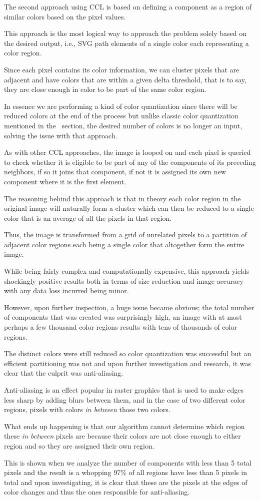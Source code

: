 \documentclass[12pt]{article}
\newcommand{\sentence}{} %
\newcommand{\italic}[1]{\textit{#1}}
\begin{document}
    \tab
    The second approach using CCL is based on defining a component as a region of similar colors based on the pixel
    values.
    \sentence
    This approach is the most logical way to approach the problem solely based on the desired output, i.e., SVG path
    elements of a single color each representing a color region.
    \sentence
    Since each pixel contains its color information, we can cluster pixels that are adjacent and have colors that are
    within a given delta threshold, that is to say, they are close enough in color to be part of the same color
    region.
    \sentence
    In essence we are performing a kind of color quantization since there will be reduced colors at the end of the
    process but unlike classic color quantization mentioned in the~
    section, the desired number of colors is no longer an input, solving the issue with that approach.
    \sentence
    As with other CCL approaches, the image is looped on and each pixel is queried to check whether it is eligible to
    be part of any of the components of its preceding neighbors, if so it joins that component, if not it is assigned
    its own new component where it is the first element.
    \sentence
    The reasoning behind this approach is that in theory each color region in the original image will naturally form
    a cluster which can then be reduced to a single color that is an average of all the pixels in that region.
    \sentence
    Thus, the image is transformed from a grid of unrelated pixels to a partition of adjacent color regions each
    being a single color that altogether form the entire image.
    \sentence

    \bigskip
    While being fairly complex and computationally expensive, this approach yields shockingly positive results both
    in terms of size reduction and image accuracy with any data loss incurred being minor.
    \sentence
    However, upon further inspection, a huge issue became obvious;
    the total number of components that was created was surprisingly high, an image with at most perhaps a few
    thousand color regions results with tens of thousands of color regions.
    \sentence
    The distinct colors were still reduced so color quantization was successful but an efficient partitioning was not
    and upon further investigation and research, it was clear that the culprit was anti-aliasing.
    \sentence
    Anti-aliasing is an effect popular in raster graphics that is used to make edges less sharp by adding blurs
    between them, and in the case of two different color regions, pixels with colors \italic{in between} those two
    colors.
    \sentence
    What ends up happening is that our algorithm cannot determine which region these \italic{in between} pixels are
    because their colors are not close enough to either region and so they are assigned their own region.
    \sentence
    This is shown when we analyze the number of components with less than 5 total pixels and the result is a whopping
    97\% of all regions have less than 5 pixels in total and upon investigating, it is clear that these are the
    pixels at the edges of color changes and thus the ones responsible for anti-aliasing.
    \sentence
\end{document}
